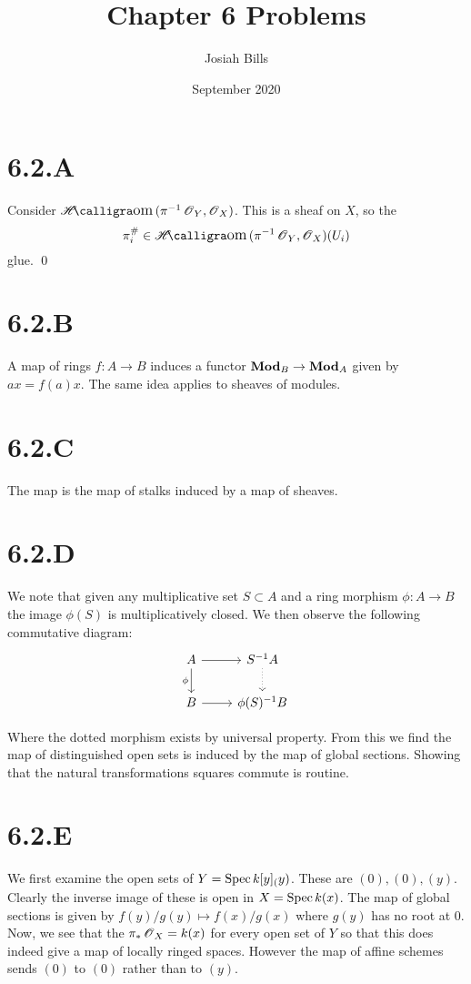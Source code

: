 \documentclass{article}
\title{Chapter 6 Problems}
\author{Josiah Bills}
\date{September 2020}
\begin{document}
\maketitle

\section{6.2.A}
Consider $\Hom(\pi^{-1}\Osh_Y, \Osh_X)$. This is a sheaf on $X$, so the
\[\pi^{\#}_i \in \Hom(\pi^{-1}\Osh_Y, \Osh_X)(U_i)\]
glue. \qed

\section{6.2.B}
A map of rings $f: A \to B$ induces a functor $\mathbf{Mod}_B \to \mathbf{Mod}_A$ given by $ax=f(a)x$. The same idea applies to sheaves of modules.

\section{6.2.C}
The map is the map of stalks induced by a map of sheaves.

\section{6.2.D}
We note that given any multiplicative set $S \subset A$ and a ring morphism $\phi : A \to B$ the image $\phi(S)$ is multiplicatively closed. We then observe the following commutative diagram:
\[
    \begin{tikzcd}
        A \ar[r] \ar[d, "\phi", swap] & S^{-1}A \ar[d, dotted] \\
        B \ar[r]                      & \phi(S)^{-1}B
    \end{tikzcd}
\]

Where the dotted morphism exists by universal property. From this we find the map of distinguished open sets is induced by the map of global sections. Showing that the natural transformations squares commute is routine.

\section{6.2.E}
We first examine the open sets of $Y=\operatorname{Spec} k[y]_(y)$. These are ${(0)}, {(0), (y)}$. Clearly the inverse image of these is open in $X=\operatorname{Spec} k(x)$. The map of global sections is given by $f(y)/g(y) \mapsto f(x)/g(x)$ where $g(y)$ has no root at 0. Now, we see that the $\pi_*\operatorname{\mathscr{O}}_X=k(x)$ for every open set of $Y$ so that this does indeed give a map of locally ringed spaces. However the map of affine schemes sends $(0)$ to $(0)$ rather than to $(y)$.
\end{document}
